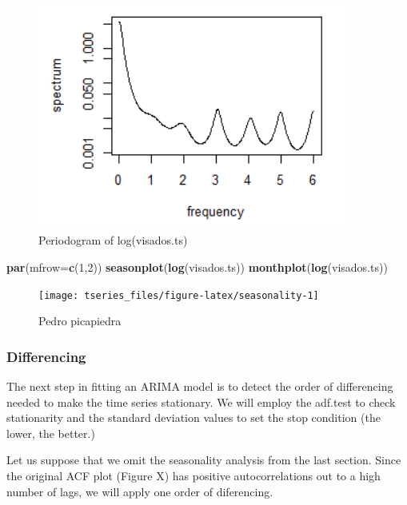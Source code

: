 \documentclass[]{article}
\newenvironment{Shaded}{\begin{snugshade}}{\end{snugshade}}
\newcommand{\KeywordTok}[1]{\textcolor[rgb]{0.13,0.29,0.53}{\textbf{{#1}}}}
\newcommand{\DataTypeTok}[1]{\textcolor[rgb]{0.13,0.29,0.53}{{#1}}}
\newcommand{\DecValTok}[1]{\textcolor[rgb]{0.00,0.00,0.81}{{#1}}}
\newcommand{\NormalTok}[1]{{#1}}
\begin{document}
\begin{figure}[H]
    \centering
    \includegraphics[width=4in]{figures/periodogram.png} 
    \caption{Periodogram of log(visados.ts)}
    \label{fig:periodogram}
\end{figure}

\begin{Shaded}
\begin{Highlighting}[]
\KeywordTok{par}\NormalTok{(}\DataTypeTok{mfrow=}\KeywordTok{c}\NormalTok{(}\DecValTok{1}\NormalTok{,}\DecValTok{2}\NormalTok{))}
\KeywordTok{seasonplot}\NormalTok{(}\KeywordTok{log}\NormalTok{(visados.ts))}
\KeywordTok{monthplot}\NormalTok{(}\KeywordTok{log}\NormalTok{(visados.ts))}
\end{Highlighting}
\end{Shaded}

\begin{figure}[H]

{\centering \texttt{[image: tseries\_files/figure-latex/seasonality-1]} 

}

\caption{Pedro picapiedra}\label{fig:seasonality}
\end{figure}

\subsubsection{Differencing}\label{differencing}

The next step in fitting an ARIMA model is to detect the order of
differencing needed to make the time series stationary. We will employ
the adf.test to check stationarity and the standard deviation values to
set the stop condition (the lower, the better.)

Let us suppose that we omit the seasonality analysis from the last
section. Since the original ACF plot (Figure X) has positive
autocorrelations out to a high number of lags, we will apply one order
of diferencing.
\end{document}
